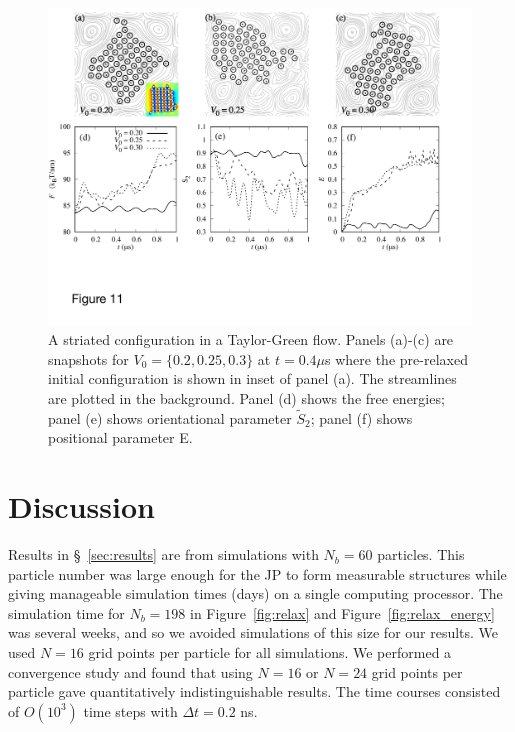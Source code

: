 \documentclass[prb,preprint,showpacs,preprintnumbers,amsmath,amssymb,longbibliography]{revtex4-1}
\begin{document}
\begin{figure}
  \begin{center}
\includegraphics[width=1.0\textwidth]{Figures/Figure11.pdf}            
  \end{center}
  \vspace{-20pt}  
  \caption{\label{fig:BC3_TG} A striated configuration in a Taylor-Green
  flow. Panels (a)-(c) are snapshots for $V_0=\{0.2, 0.25, 0.3\}$ at
  $t=0.4\mu$s where the pre-relaxed initial configuration is shown in
  inset of panel (a). The streamlines are plotted in the background.
  Panel (d) shows the free energies; panel (e) shows orientational
  parameter $\tilde{S}_2$; panel (f) shows positional parameter E.}
\end{figure}



\section{Discussion\label{sec:discussion}}
Results in \S~\ref{sec:results} are from simulations with $N_b = 60$ particles.
This particle number was
large enough for the JP to form measurable structures while giving
manageable simulation times (days) on a single computing processor. The
simulation time for $N_b = 198$ in Figure~\ref{fig:relax} and
Figure~\ref{fig:relax_energy} was several weeks, and so we avoided
simulations of this size for our results. We used $N = 16$ grid points
per particle for all simulations. We performed a convergence study and
found that using $N = 16$ or $N = 24$ grid points per particle gave
quantitatively indistinguishable results. The time courses consisted of
$O(10^3)$ time steps with $\Delta t = 0.2$ ns.
\end{document}
